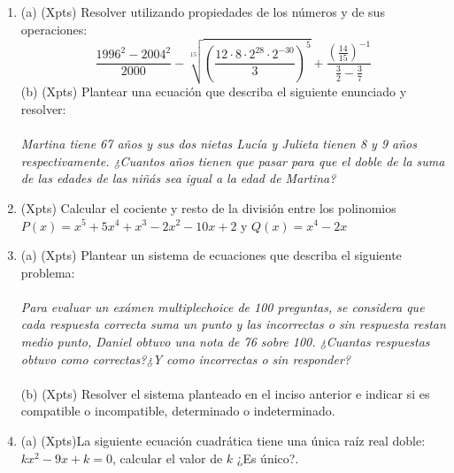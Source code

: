 \documentclass[a4paper]{article}
\begin{document}
\begin{enumerate}
        \item (a) (Xpts) Resolver utilizando propiedades de los números y de sus operaciones:
        \begin{equation*}
                \frac{1996^2-2004^2}{2000}-\sqrt[15]{\left(\frac{12\cdot 8\cdot 2^{28} \cdot 2^{-30}}{3}\right)^5} + \frac{\left(\frac{14}{15}\right)^{-1}}{\frac{3}{2}-\frac{3}{7}}
        \end{equation*}
        (b) (Xpts) Plantear una ecuación que describa el siguiente enunciado y resolver:\\\\
         \textit{Martina tiene 67 años y sus dos nietas Lucía y Julieta tienen 8 y 9 años respectivamente. ¿Cuantos años tienen que pasar para que el doble de la suma de las edades de las niñás sea igual a la edad de Martina?}
        \item (Xpts) Calcular el cociente y resto de la división entre los polinomios $P(x)=x^5+5x^4+x^3-2x^2-10x+2$ y $Q(x)=x^4-2x$
        \item (a) (Xpts) Plantear un sistema de ecuaciones que describa el siguiente problema:\\\\
        \textit{Para evaluar un exámen multiplechoice de 100 preguntas, se considera que cada respuesta correcta suma un punto y las incorrectas o sin respuesta restan medio punto, Daniel obtuvo una nota de 76 sobre 100. ¿Cuantas respuestas obtuvo como correctas?¿Y como incorrectas o sin responder?}\\\\
        (b) (Xpts) Resolver el sistema planteado en el inciso anterior e indicar si es compatible o incompatible, determinado o indeterminado.
        \item (a) (Xpts)La siguiente ecuación cuadrática tiene una única raíz real doble: $k x^2 - 9x + k = 0$, calcular el valor de $k$ ¿Es único?.\\\\

\end{enumerate}
\end{document}
